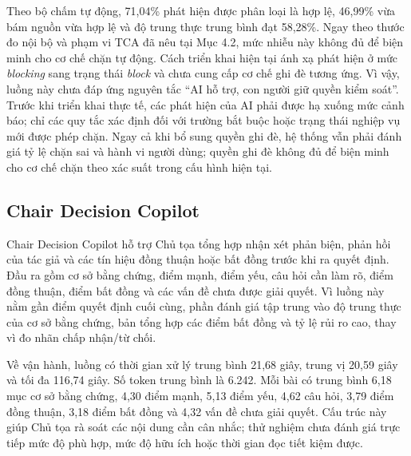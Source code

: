 Theo bộ chấm tự động, 71,04\% phát hiện được phân loại là hợp lệ, 46,99\% vừa bám nguồn vừa hợp lệ và độ trung thực trung bình đạt 58,28\%. Ngay theo thước đo nội bộ và phạm vi TCA đã nêu tại Mục 4.2, mức nhiễu này không đủ để biện minh cho cơ chế chặn tự động. Cách triển khai hiện tại ánh xạ phát hiện ở mức \textit{blocking} sang trạng thái \textit{block} và chưa cung cấp cơ chế ghi đè tương ứng. Vì vậy, luồng này chưa đáp ứng nguyên tắc ``AI hỗ trợ, con người giữ quyền kiểm soát''. Trước khi triển khai thực tế, các phát hiện của AI phải được hạ xuống mức cảnh báo; chỉ các quy tắc xác định đối với trường bắt buộc hoặc trạng thái nghiệp vụ mới được phép chặn. Ngay cả khi bổ sung quyền ghi đè, hệ thống vẫn phải đánh giá tỷ lệ chặn sai và hành vi người dùng; quyền ghi đè không đủ để biện minh cho cơ chế chặn theo xác suất trong cấu hình hiện tại.

\subsection{Chair Decision Copilot}

Chair Decision Copilot hỗ trợ Chủ tọa tổng hợp nhận xét phản biện, phản hồi của tác giả và các tín hiệu đồng thuận hoặc bất đồng trước khi ra quyết định. Đầu ra gồm cơ sở bằng chứng, điểm mạnh, điểm yếu, câu hỏi cần làm rõ, điểm đồng thuận, điểm bất đồng và các vấn đề chưa được giải quyết. Vì luồng này nằm gần điểm quyết định cuối cùng, phần đánh giá tập trung vào độ trung thực của cơ sở bằng chứng, bản tổng hợp các điểm bất đồng và tỷ lệ rủi ro cao, thay vì đo nhãn chấp nhận/từ chối.

Về vận hành, luồng có thời gian xử lý trung bình 21,68 giây, trung vị 20,59 giây và tối đa 116,74 giây. Số token trung bình là 6.242. Mỗi bài có trung bình 6,18 mục cơ sở bằng chứng, 4,30 điểm mạnh, 5,13 điểm yếu, 4,62 câu hỏi, 3,79 điểm đồng thuận, 3,18 điểm bất đồng và 4,32 vấn đề chưa giải quyết. Cấu trúc này giúp Chủ tọa rà soát các nội dung cần cân nhắc; thử nghiệm chưa đánh giá trực tiếp mức độ phù hợp, mức độ hữu ích hoặc thời gian đọc tiết kiệm được.



